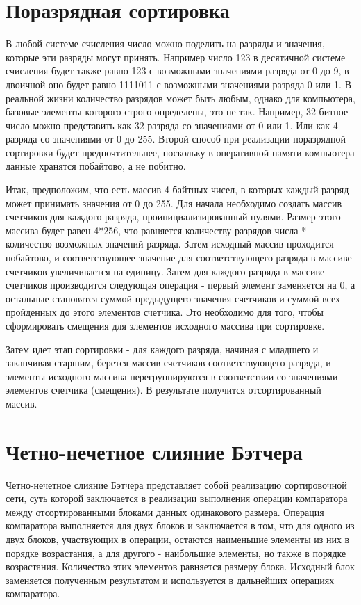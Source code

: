 \documentclass{report}
\begin{document}
\newpage

\section*{Поразрядная сортировка}
\par В любой системе счисления число можно поделить на разряды и значения, которые эти разряды могут принять. Например число 123 в десятичной системе счисления будет также равно 123 с возможными значениями разряда от 0 до 9, в двоичной оно будет равно 1111011 с возможными значениями разряда 0 или 1. В реальной жизни количество разрядов может быть любым, однако для компьютера, базовые элементы которого строго определены, это не так. Например, 32-битное число можно представить как 32 разряда со значениями от 0 или 1. Или как 4 разряда со значениями от 0 до 255. Второй способ при реализации поразрядной сортировки будет предпочтительнее, поскольку в оперативной памяти компьютера данные хранятся побайтово, а не побитно.
\par Итак, предположим, что есть массив 4-байтных чисел, в которых каждый разряд может принимать значения от 0 до 255. Для начала необходимо создать массив счетчиков для каждого разряда, проинициализированный нулями. Размер этого массива будет равен 4*256, что равняется количеству разрядов числа * количество возможных значений разряда. Затем исходный массив проходится побайтово, и соответствующее значение для соответствующего разряда в массиве счетчиков увеличивается на единицу. Затем для каждого разряда в массиве счетчиков производится следующая операция - первый элемент заменяется на 0, а остальные становятся суммой предыдущего значения счетчиков и суммой всех пройденных до этого элементов счетчика. Это необходимо для того, чтобы сформировать смещения для элементов исходного массива при сортировке.
\par Затем идет этап сортировки - для каждого разряда, начиная с младшего и заканчивая старшим, берется массив счетчиков соответствующего разряда, и элементы исходного массива перегруппируются в соответствии со значениями элементов счетчика (смещения). В результате получится отсортированный массив.

\newpage

\section*{Четно-нечетное слияние Бэтчера}
\par Четно-нечетное слияние Бэтчера представляет собой реализацию сортировочной сети, суть которой заключается в реализации выполнения операции компаратора между отсортированными блоками данных одинакового размера. Операция компаратора выполняется для двух блоков и заключается в том, что для одного из двух блоков, участвующих в операции, остаются наименьшие элементы из них в порядке возрастания, а для другого - наибольшие элементы, но также в порядке возрастания. Количество этих элементов равняется размеру блока. Исходный блок заменяется полученным результатом и используется в дальнейших операциях компаратора.
\end{document}
